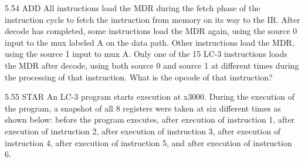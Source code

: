 \documentclass{patt}
\begin{document}
\begin{exercises}
\item[5.54]ADD All instructions load the MDR during the fetch phase of the instruction cycle to fetch the instruction from memory on its way to the IR.  After decode has completed, some instructions load the MDR again, using the source 0 input to the mux labeled A on the data path. Other instructions load the MDR, using the source 1 input to mux A.  Only one of the 15 LC-3 instructions loads the MDR after decode, using both source 0 and source 1 at different times during the processing of that instruction.  What is the opcode of that instruction?

\item[5.55]STAR An LC-3 program starts execution at x3000. During the execution of the
program, a snapshot of all 8 registers were taken at six different times as
shown below: before
the program executes, after execution of instruction 1, after execution of
instruction 2, after execution of instruction 3, after execution of instruction
4, after execution of instruction 5, and after execution of instruction 6. 

\vspace{0.2in}

\begin{table}[h*]
\setlength{\tabcolsep}{0.6\tabcolsep}

\setlength{\extrarowheight}{0.08in}


\end{table}
\end{exercises}
\end{document}
